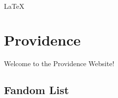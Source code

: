 \documentclass{article}
\begin{document}
\LaTeX

\section{Providence}
Welcome to the Providence Website!
\subsection{Fandom List}

\end{document}
